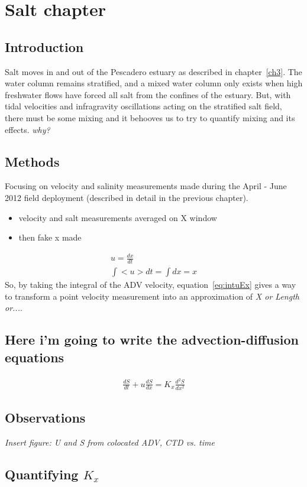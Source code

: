 \chapter{Salt chapter}
\label{chSalt}


\section{Introduction}
Salt moves in and out of the Pescadero estuary as described in chapter~\ref{ch3}. The water column remains stratified, and a mixed water column only exists when high freshwater flows have forced all salt from the confines of the estuary. But, with tidal velocities and infragravity oscillations acting on the stratified salt field, there must be some mixing and it behooves us to try to quantify mixing and its effects. \emph{why?}

\section{Methods}
Focusing on velocity and salinity measurements made during the April - June 2012 field deployment (described in detail in the previous chapter).

\begin{itemize} \item{velocity and salt measurements averaged on X window} \item{then fake x made} \end{itemize}

\begin{eqnarray}
u = \frac{dx}{dt} \label{eq:uEdxdt}\\
\int{<u>dt} = \int{dx} = x \label{eq:intuEx}
\end{eqnarray}
So, by taking the integral of the ADV velocity, equation~\ref{eq:intuEx} gives a way to transform a point velocity measurement into an approximation of \emph{X or Length or...}. 


\section{Here i'm going to write the advection-diffusion equations}
\begin{eqnarray}
\frac{dS}{dt} + u\frac{dS}{dx} = K_x\frac{d^2S}{dx^2} \label{eq:1dadvdiff}
\end{eqnarray}


\section{Observations}
\emph{Insert figure: U and S from colocated ADV, CTD vs. time}



\section{Quantifying $K_x$}
